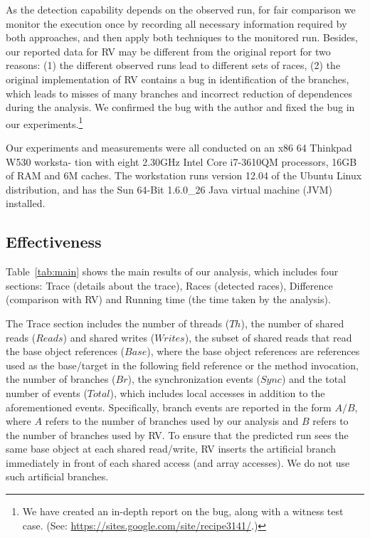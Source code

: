  As the detection capability  depends on the observed run, for fair comparison we monitor the execution once by recording all necessary information required by both approaches, and then apply both techniques to the monitored run. Besides, our reported data for RV may be different from the original report for two reasons: (1) the different observed runs lead to different sets of races, (2) the original implementation of RV contains a bug in identification of the branches, which leads to  misses of many branches and  incorrect reduction of dependences during the analysis. We confirmed the bug with the author and fixed the bug in our experiments.\footnote{We have created an in-depth report on the bug, along with a witness test case. (See:  \url{https://sites.google.com/site/recipe3141/}.)}


Our experiments and measurements 
were all conducted on an x86 64 Thinkpad W530 worksta- 
tion with eight 2.30GHz Intel Core i7-3610QM processors, 
16GB of RAM and 6M caches. The workstation runs version 12.04 of the Ubuntu Linux distribution, and has the Sun 
64-Bit 1.6.0\_26 Java virtual machine (JVM) installed.










\subsection{Effectiveness}
Table~\ref{tab:main} shows the main results of our analysis, which includes four sections: Trace (details about the trace), Races (detected races), Difference (comparison with RV) and Running time (the time taken by the analysis).


The Trace section includes the number of threads ($Th$), the number of shared reads ($Reads$) and shared writes ($Writes$), the subset of shared reads that read the base object references  ($Base$), where the  base object references are references used as the base/target in the following field reference or the method invocation,  the number of branches ($Br$), the synchronization events ($Sync$) and the total number of events ($Total$), which includes local accesses in addition to the aforementioned events. Specifically, branch events are reported in the form $A/B$, where $A$ refers to the number of branches used by our analysis and $B$ refers to the number of branches used by RV. To ensure that the predicted run sees the same base object at each shared read/write, {\sf RV} inserts the artificial branch immediately in front of each shared access (and array accesses). We do not use such artificial branches.


